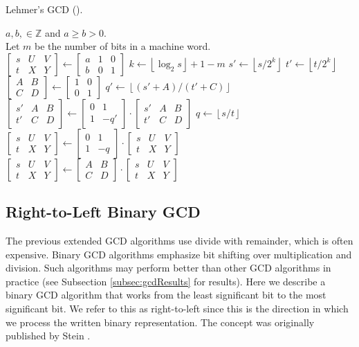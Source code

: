 \documentclass{ucalgthes1}
\theoremstyle{definition}
\newcommand{\ZZ}{\mathbb{Z}}
\newcommand{\matrixtt}[4]{\left[ \begin{array}{rr} #1 & #2 \\ #3 & #4 \end{array} \right]}
\newcommand{\matrixThreeTwo}[6]{\left[ \begin{array}{rrr} #1 & #2 & #3 \\ #4 & #5 & #6 \end{array} \right]}
\newcommand{\floor}[1]{\left\lfloor #1 \right\rfloor}
\begin{document}
\begin{algorithm}[h]
\caption{Lehmer's GCD (\cite{Lehmer1938}).}
\label{alg:lehmerGcd}
\begin{algorithmic}[1]
\REQUIRE $a,b, \in \ZZ$ and $a \ge b > 0$. \\
         Let $m$ be the number of bits in a machine word. \\
\STATE $\matrixThreeTwo{s}{U}{V}{t}{X}{Y} \gets \matrixThreeTwo{a}{1}{0}{b}{0}{1}$
	\STATE $k \gets \floor{\log_2 s} + 1 - m$
	\STATE $s' \gets \floor{s / 2^k}$ 
	\STATE $t' \gets \floor{t / 2^k}$
	\STATE $\matrixtt{A}{B}{C}{D} \gets \matrixtt{1}{0}{0}{1}$
	\WHILE{$t' \neq 0$ and $\floor{(s'+A)/(t'+C)} = \floor{(s'+B)/(t'+D)}$}
		\STATE $q' \gets \floor{(s'+A)/(t'+C)}$ 
		\STATE $\matrixThreeTwo{s'}{A}{B}{t'}{C}{D} \gets \matrixtt{0}{1}{1}{-q'}
			    \cdot \matrixThreeTwo{s'}{A}{B}{t'}{C}{D}$
	\ENDWHILE
		\STATE $q \gets \floor{s/t}$  
		\STATE $\matrixThreeTwo{s}{U}{V}{t}{X}{Y} \gets \matrixtt{0}{1}{1}{-q}
		        \cdot \matrixThreeTwo{s}{U}{V}{t}{X}{Y}$
	\ELSE
		\STATE $\matrixThreeTwo{s}{U}{V}{t}{X}{Y} \gets \matrixtt{A}{B}{C}{D}
		        \cdot \matrixThreeTwo{s}{U}{V}{t}{X}{Y}$ 
	\ENDIF
\ENDWHILE
\end{algorithmic}
\end{algorithm}


\subsection{Right-to-Left Binary GCD}
\label{subsec:r2lBinGcd}

The previous extended GCD algorithms use divide with remainder, which is often expensive.  Binary GCD algorithms emphasize bit shifting over multiplication and division.  Such algorithms may perform better than other GCD algorithms in practice (see Subsection \ref{subsec:gcdResults} for results).  Here we describe a binary GCD algorithm that works from the least significant bit to the most significant bit.  We refer to this as right-to-left since this is the direction in which we process the written binary representation.  The concept was originally published by Stein \cite{Stein1967}.
\end{document}

